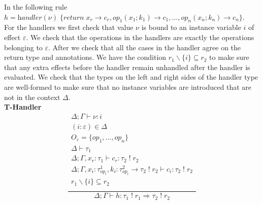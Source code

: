 \documentclass[12pt]{article}
\newcommand\eff[0]{\varepsilon}
\newcommand\Op[0]{O}
\newcommand\op[0]{op}
\newcommand\pty[1]{\ty^1_{#1}}
\newcommand\rty[1]{\ty^2_{#1}}
\newcommand\ty[0]{\tau}
\newcommand\tarr[2]{#1 \rightarrow #2}
\newcommand\thandler[2]{#1 \Rightarrow #2}
\newcommand\aty[2]{#1 \; ! \; #2}
\newcommand\val[0]{\nu}
\newcommand\vhandleri[2]{\textit{handler} ( #1 ) \; \{#2\}}
\newcommand\comp[0]{c}
\begin{document}
\vspace{10pt}
In the following rule \\$h = 
	\vhandleri{\val}{
		\textit{return} \; x_r \rightarrow \comp_r,
		\op_1(x_1 ; k_1) \rightarrow \comp_1,
		...,
		\op_n(x_n ; k_n) \rightarrow \comp_n
	}$.\\
For the handlers we first check that value $\val$ is bound to an instance variable $i$ of effect $\eff$.
We check that the operations in the handlers are exactly the operations belonging to $\eff$.
After we check that all the cases in the handler agree on the return type and annotations.
We have the condition $r_1 \backslash \{ i \} \subseteq r_2$ to make sure that any extra effects before the handler remain unhandled after the handler is evaluated.
We check that the types on the left and right sides of the handler type are well-formed to make sure that no instance variables are introduced that are not in the context $\Delta$.
\\\textbf{T-Handler}
\[\frac{
	\begin{array}{l}
	\Delta;\Gamma \vdash \val : i \\
	(i:\eff)\in\Delta \\
	\Op_\eff = \{ op_1, ..., op_n \} \\
	\Delta \vdash \ty_1 \\
	\Delta;\Gamma, x_r : \ty_1 \vdash \comp_r : \aty{\ty_2}{r_2} \\
	\Delta;\Gamma, x_i : \pty{\op_i}, k_i : \tarr{\rty{\op_i}}{\aty{\ty_2}{r_2}} \vdash \comp_i : \aty{\ty_2}{r_2} \\
	r_1 \backslash \{ i \} \subseteq r_2 \\
	\end{array}
}{
	\Delta;\Gamma \vdash h :
	\thandler{\aty{\ty_1}{r_1}}{\aty{\ty_2}{r_2}}
}\]
\end{document}
